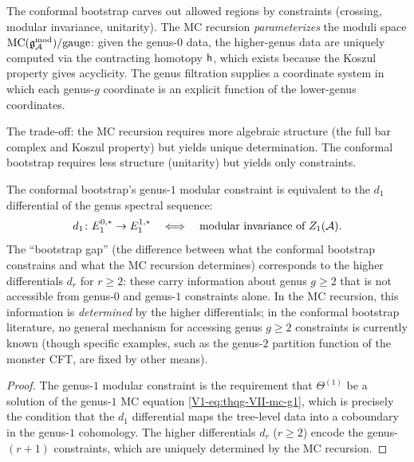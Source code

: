 \begin{remark}
The conformal bootstrap carves out allowed regions by
constraints (crossing, modular invariance, unitarity). The MC
recursion \emph{parameterizes} the moduli space
$\text{MC}(\mathfrak{g}_{\mathcal{A}}^{\mathrm{mod}})/\text{gauge}$: given the genus-$0$ data, the
higher-genus data are uniquely computed via the contracting
homotopy $\mathsf{h}$, which exists because the Koszul property
gives acyclicity. The genus filtration supplies a coordinate
system in which each genus-$g$ coordinate is an explicit
function of the lower-genus coordinates.

The trade-off: the MC recursion requires more algebraic
structure (the full bar complex and Koszul property) but yields
unique determination. The conformal bootstrap requires less
structure (unitarity) but yields only constraints.
\end{remark}

\begin{proposition}
\ClaimStatusProvedHere
The conformal bootstrap's genus-$1$ modular constraint is
equivalent to the $d_1$ differential of the genus spectral
sequence:
\begin{equation}%
d_1 \colon E_1^{0,*} \to E_1^{1,*}
\quad\Longleftrightarrow\quad
\text{modular invariance of } Z_1(\cA).
\end{equation}
The ``bootstrap gap'' (the difference between what the
conformal bootstrap constrains and what the MC recursion
determines) corresponds to the higher differentials
$d_r$ for $r \geq 2$: these carry information about genus
$g \geq 2$ that is not accessible from genus-$0$ and genus-$1$
constraints alone. In the MC recursion, this information
is \emph{determined} by the higher differentials;
in the conformal bootstrap literature, no general mechanism
for accessing genus $g \geq 2$ constraints is currently known
(though specific examples, such as the genus-$2$ partition
function of the monster CFT, are fixed by other means).
\end{proposition}

\begin{proof}
The genus-$1$ modular constraint is the requirement that
$\Theta^{(1)}$ be a solution of the genus-$1$ MC equation
\eqref{V1-eq:thqg-VII-mc-g1}, which is precisely the condition
that the $d_1$ differential maps the tree-level data into a
coboundary in the genus-$1$ cohomology. The higher differentials
$d_r$ ($r \geq 2$) encode the genus-$(r{+}1)$ constraints, which
are uniquely determined by the MC recursion.
\end{proof}


